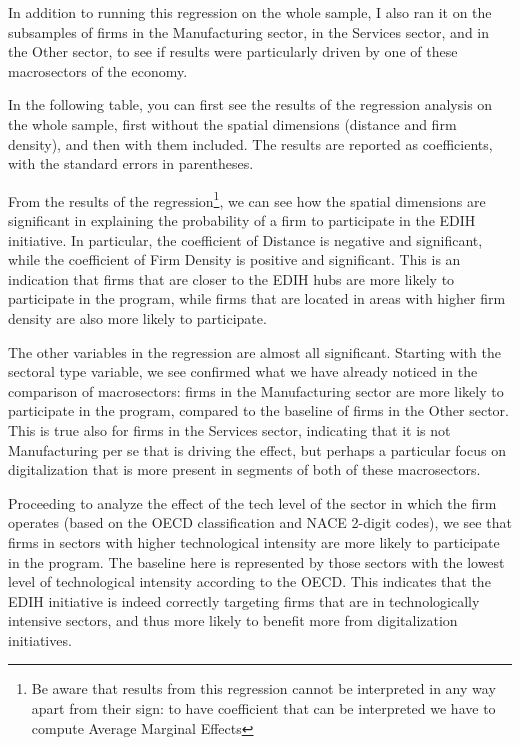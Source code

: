 \documentclass[12pt]{report}
\begin{document}
\par In addition to running this regression on the whole sample, I also ran it on the subsamples of firms in the Manufacturing sector, in the Services sector, and in the Other sector, to see if results were particularly driven by one of these macrosectors of the economy.

\par In the following table, you can first see the results of the regression analysis on the whole sample, first without the spatial dimensions (distance and firm density), and then with them included. The results are reported as coefficients, with the standard errors in parentheses.



\par From the results of the regression\footnote{Be aware that results from this regression cannot be interpreted in any way apart from their sign: to have coefficient that can be interpreted we have to compute Average Marginal Effects}, we can see how the spatial dimensions are significant in explaining the probability of a firm to participate in the EDIH initiative. In particular, the coefficient of Distance is negative and significant, while the coefficient of Firm Density is positive and significant. This is an indication that firms that are closer to the EDIH hubs are more likely to participate in the program, while firms that are located in areas with higher firm density are also more likely to participate.

\par The other variables in the regression are almost all significant. Starting with the sectoral type variable, we see confirmed what we have already noticed in the comparison of macrosectors: firms in the Manufacturing sector are more likely to participate in the program, compared to the baseline of firms in the Other sector. This is true also for firms in the Services sector, indicating that it is not Manufacturing per se that is driving the effect, but perhaps a particular focus on digitalization that is more present in segments of both of these macrosectors. 

\par Proceeding to analyze the effect of the tech level of the sector in which the firm operates (based on the OECD classification and NACE 2-digit codes), we see that firms in sectors with higher technological intensity are more likely to participate in the program. The baseline here is represented by those sectors with the lowest level of technological intensity according to the OECD. This indicates that the EDIH initiative is indeed correctly targeting firms that are in technologically intensive sectors, and thus more likely to benefit more from digitalization initiatives.
\end{document}
